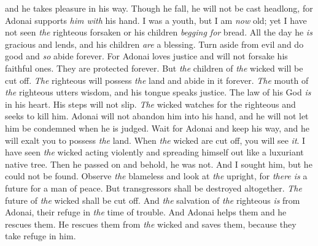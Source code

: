 \begin{biblechapter}
and he takes pleasure in his way.
\verse Though he fall, he will not be cast headlong, 
for Adonai supports \textit{him with} his hand.
\verse I was a youth, but I am \textit{now} old; 
yet I have not seen \textit{the} righteous forsaken 
or his children \textit{begging for} bread.
\verse All the day he \textit{is} gracious and lends, 
and his children \textit{are} a blessing.
\verse Turn aside from evil and do good 
and \textit{so} abide forever.
\verse For Adonai loves justice 
and will not forsake his faithful ones. 
They are protected forever. 
But \textit{the} children of \textit{the} wicked will be cut off.
\verse \textit{The} righteous will possess \textit{the} land 
and abide in it forever.
\verse \textit{The} mouth of \textit{the} righteous utters wisdom, 
and his tongue speaks justice.
\verse The law of his God \textit{is} in his heart. 
His steps will not slip.
\verse \textit{The} wicked watches for the righteous 
and seeks to kill him.
\verse Adonai will not abandon him into his hand, 
and he will not let him be condemned when he is judged.
\verse Wait for Adonai and keep his way, 
and he will exalt you to possess \textit{the} land. 
When \textit{the} wicked are cut off, you will see \textit{it}.
\verse I have seen \textit{the} wicked acting violently 
and spreading himself out 
like a luxuriant native tree.
\verse Then he passed on and behold, he was not. 
And I sought him, but he could not be found.
\verse Observe \textit{the} blameless and look at \textit{the} upright, 
for \textit{there is} a future for a man of peace.
\verse But transgressors shall be destroyed altogether. 
\textit{The} future of \textit{the} wicked shall be cut off.
\verse And \textit{the} salvation of \textit{the} righteous \textit{is} from Adonai, 
their refuge in \textit{the} time of trouble.
\verse And Adonai helps them and he rescues them. 
He rescues them from \textit{the} wicked and saves them, 
because they take refuge in him.
\end{biblechapter}


